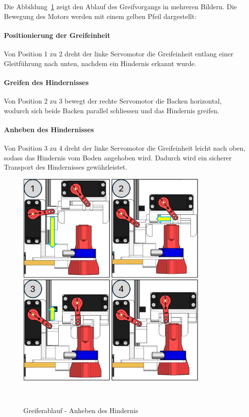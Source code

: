 \documentclass[main.tex]{subfiles} %
\begin{document}
\newpage

Die Abbildung~\ref{fig:Greiferablauf} zeigt den Ablauf des Greifvorgangs in mehreren Bildern. Die Bewegung des Motors werden mit einem gelben Pfeil dargestellt:

\paragraph{Positionierung der Greifeinheit} 
Von Position 1 zu 2 dreht der linke Servomotor die Greifeinheit entlang einer Gleitführung nach unten, nachdem ein Hindernis erkannt wurde.

\paragraph{Greifen des Hindernisses} 

Von Position 2 zu 3 bewegt der rechte Servomotor die Backen horizontal, wodurch sich beide Backen parallel schliessen und das Hindernis greifen.

\paragraph{Anheben des Hindernisses} 

Von Position 3 zu 4 dreht der linke Servomotor die Greifeinheit leicht nach oben, sodass das Hindernis vom Boden angehoben wird. 
Dadurch wird ein sicherer Transport des Hindernisses gewährleistet.

\begin{figure}[H]
    \centering
    \includegraphics[width=0.85\textwidth]{Greiferablauf.png}
    \caption{Greiferablauf - Anheben des Hindernis}~\label{fig:Greiferablauf}
\end{figure}
\end{document}
